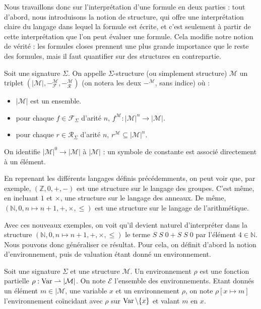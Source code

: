 Nous travaillons donc sur l'interprétation d'une formule en deux parties : tout
d'abord, nous introduisons la notion de structure, qui offre une interprétation
claire du langage dans lequel la formule est écrite, et c'est seulement à partir
de cette interprétation que l'on peut évaluer une formule. Cela modifie notre
notion de vérité : les formules closes prennent une plus grande importance que
le reste des formules, mais il faut quantifier sur des structures en
contrepartie.

\begin{definition}[Structure]
  Soit une signature $\Sigma$. On appelle $\Sigma$-structure (ou simplement
  structure) $\mathcal M$ un triplet
  $(|\mathcal M|,-^{\mathcal M}_\mathcal F,-^{\mathcal M}_\mathcal R)$
  (on notera les deux $-^{\mathcal M}$, sans indice) où :
  \begin{itemize}
  \item $|\mathcal M|$ est un ensemble.
  \item pour chaque $f\in \mathcal F_\Sigma$ d'arité $n$,
    $f^{\mathcal M} : |\mathcal M|^n \to |\mathcal M|$.
  \item pour chaque $r\in\mathcal R_\Sigma$ d'arité $n$,
    $r^{\mathcal M} \subseteq |\mathcal M|^n$.
  \end{itemize}

  On identifie $|\mathcal M|^0 \to |\mathcal M|$ à $|\mathcal M|$ : un symbole
  de constante est associé directement à un élément.
\end{definition}

\begin{example}
  En reprenant les différents langages définis précédemments, on peut voir que,
  par exemple, $(\mathbb Z,0,+,-)$ est une structure sur le langage des groupes.
  C'est même, en incluant $1$ et $\times$, une structure sur le langage des
  anneaux. De même, $(\mathbb N,0,n\mapsto n + 1,+,\times,\leq)$ est une
  structure sur le langage de l'arithmétique.
\end{example}

Avec ces nouveaux exemples, on voit qu'il devient naturel d'interpréter dans la
structure $(\mathbb N,0,n\mapsto n+1,+,\times,\leq)$ le terme $S\;S\;0 + S\;S\;0$
par l'élément $4\in\mathbb N$. Nous pouvons donc généraliser ce résultat. Pour
cela, on définit d'abord la notion d'environnement, puis de valuation étant donné
un environnement.

\begin{definition}[Environnement]
  Soit une signature $\Sigma$ et une structure $\mathcal M$. Un environnement
  $\rho$ est une fonction partielle $\rho : \operatorname{Var}\rightharpoonup |\mathcal M|$. On note
  $\mathcal E$ l'ensemble des environnements. Etant donnés un élément
  $m\in|\mathcal M$, une variable $x$ et un environnement $\rho$, on note
  $\rho[x \mapsto m]$ l'environnement coïncidant avec $\rho$ sur
  $\operatorname{Var}\backslash\{x\}$ et valant $m$ en $x$.
\end{definition}

